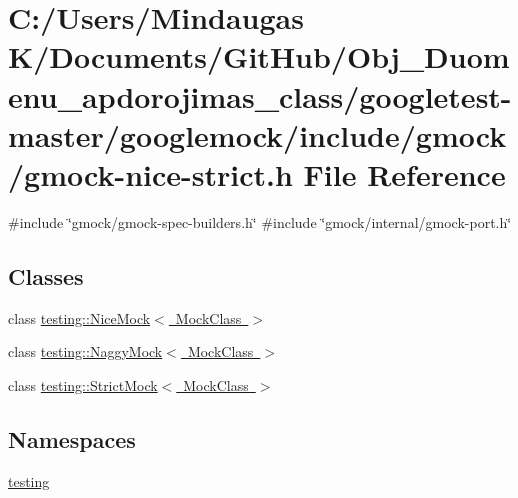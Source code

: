 \hypertarget{googletest-master_2googlemock_2include_2gmock_2gmock-nice-strict_8h}{}\section{C\+:/\+Users/\+Mindaugas K/\+Documents/\+Git\+Hub/\+Obj\+\_\+\+Duomenu\+\_\+apdorojimas\+\_\+class/googletest-\/master/googlemock/include/gmock/gmock-\/nice-\/strict.h File Reference}
\label{googletest-master_2googlemock_2include_2gmock_2gmock-nice-strict_8h}
{\ttfamily \#include \char`\"{}gmock/gmock-\/spec-\/builders.\+h\char`\"{}}\newline
{\ttfamily \#include \char`\"{}gmock/internal/gmock-\/port.\+h\char`\"{}}\newline
\subsection*{Classes}
\begin{DoxyCompactItemize}
\item 
class \mbox{\hyperlink{classtesting_1_1_nice_mock}{testing\+::\+Nice\+Mock$<$ Mock\+Class $>$}}
\item 
class \mbox{\hyperlink{classtesting_1_1_naggy_mock}{testing\+::\+Naggy\+Mock$<$ Mock\+Class $>$}}
\item 
class \mbox{\hyperlink{classtesting_1_1_strict_mock}{testing\+::\+Strict\+Mock$<$ Mock\+Class $>$}}
\end{DoxyCompactItemize}
\subsection*{Namespaces}
\begin{DoxyCompactItemize}
\item 
 \mbox{\hyperlink{namespacetesting}{testing}}
\end{DoxyCompactItemize}
